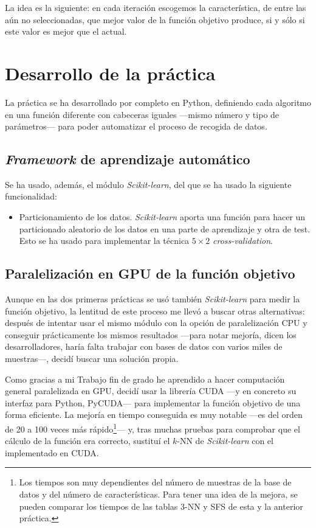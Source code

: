 \documentclass[a4paper, 11pt, titlepage]{article}
\begin{document}
    La idea es la siguiente: en cada iteración escogemos la característica, de entre las aún no seleccionadas, que mejor valor de la función objetivo produce, si y sólo si este valor es mejor que el actual.

    \section{Desarrollo de la práctica}

    La práctica se ha desarrollado por completo en Python, definiendo cada algoritmo en una función diferente con cabeceras iguales ---mismo número y tipo de parámetros--- para poder automatizar el proceso de recogida de datos.

    \subsection{\emph{Framework} de aprendizaje automático}
    Se ha usado, además, el módulo \emph{Scikit-learn}, del que se ha usado la siguiente funcionalidad:
    \begin{itemize}
        \item Particionamiento de los datos. \emph{Scikit-learn} aporta una función para hacer un particionado aleatorio de los datos en una parte de aprendizaje y otra de test. Esto se ha usado para implementar la técnica $5\times2$ \emph{cross-validation}.
    \end{itemize}

    \subsection{Paralelización en GPU de la función objetivo}

    Aunque en las dos primeras prácticas se usó también \emph{Scikit-learn} para medir la función objetivo, la lentitud de este proceso me llevó a buscar otras alternativas: después de intentar usar el mismo módulo con la opción de paralelización CPU y conseguir prácticamente los mismos resultados ---para notar mejoría, dicen los desarrolladores, haría falta trabajar con bases de datos con varios miles de muestras---, decidí buscar una solución propia.

    Como gracias a mi Trabajo fin de grado he aprendido a hacer computación general paralelizada en GPU, decidí usar la librería CUDA ---y en concreto su interfaz para Python, PyCUDA--- para implementar la función objetivo de una forma eficiente. La mejoría en tiempo conseguida es muy notable ---es del orden de 20 a 100 veces más rápido\footnote{Los tiempos son muy dependientes del número de muestras de la base de datos y del número de características. Para tener una idea de la mejora, se pueden comparar los tiempos de las tablas 3-NN y SFS de esta y la anterior práctica.}--- y, tras muchas pruebas para comprobar que el cálculo de la función era correcto, sustituí el $k$-NN de \emph{Scikit-learn} con el implementado en CUDA.
\end{document}
